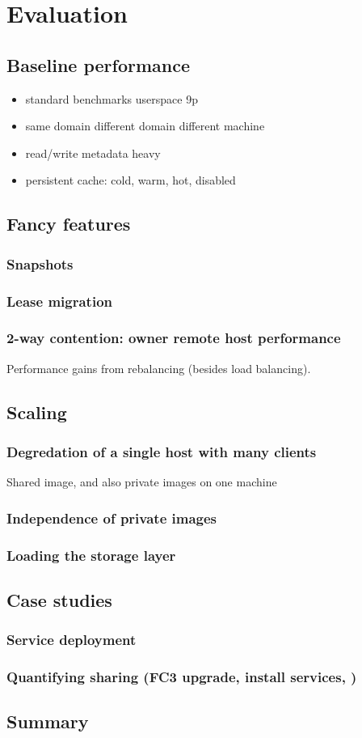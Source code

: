 \chapter{Evaluation}

\section{Baseline performance}
\begin{itemize}
\item standard benchmarks \vs userspace 9p
\item same domain \vs different domain \vs different machine
\item read/write \vs metadata heavy
\item persistent cache: cold, warm, hot, disabled
\end{itemize}

\section{Fancy features}
\subsection{Snapshots}
\subsection{Lease migration}
\subsection{2-way contention: owner \vs remote host performance}
Performance gains from rebalancing (besides load balancing).

\section{Scaling}
\subsection{Degredation of a single host with many clients}
Shared image, and also private images on one machine
\subsection{Independence of private images}
\subsection{Loading the storage layer}

\section{Case studies}
\subsection{Service deployment}
\subsection{Quantifying sharing (FC3 upgrade, install services, \etc)}

\section{Summary}